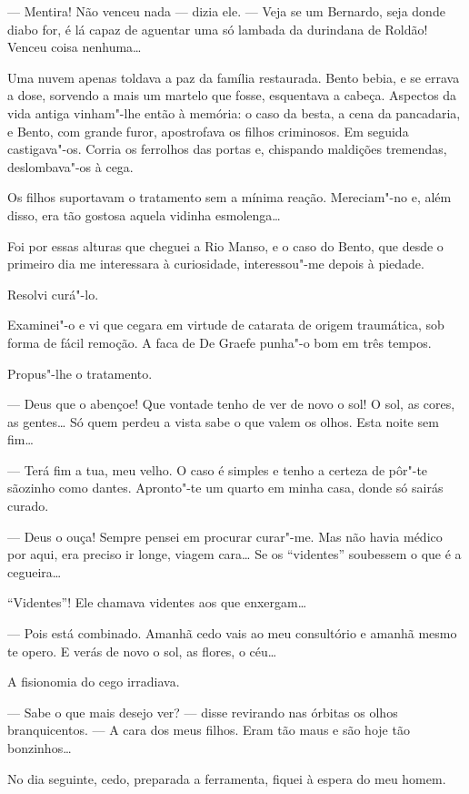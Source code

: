 --- Mentira! Não venceu nada --- dizia ele. --- Veja se um Bernardo,
seja donde diabo for, é lá capaz de aguentar uma só lambada da durindana
de Roldão! Venceu coisa nenhuma\ldots{}

Uma nuvem apenas toldava a paz da família restaurada. Bento bebia, e se
errava a dose, sorvendo a mais um martelo que fosse, esquentava a
cabeça. Aspectos da vida antiga vinham"-lhe então à memória: o caso da
besta, a cena da pancadaria, e Bento, com grande furor, apostrofava os
filhos criminosos. Em seguida castigava"-os. Corria os ferrolhos das
portas e, chispando maldições tremendas, deslombava"-os à cega.

Os filhos suportavam o tratamento sem a mínima reação. Mereciam"-no e,
além disso, era tão gostosa aquela vidinha esmolenga\ldots{}

Foi por essas alturas que cheguei a Rio Manso, e o caso do Bento, que
desde o primeiro dia me interessara à curiosidade, interessou"-me depois
à piedade.

Resolvi curá"-lo.

Examinei"-o e vi que cegara em virtude de catarata de origem traumática,
sob forma de fácil remoção. A faca de De Graefe punha"-o bom em três
tempos.

Propus"-lhe o tratamento.

--- Deus que o abençoe! Que vontade tenho de ver de novo o sol! O sol,
as cores, as gentes\ldots{} Só quem perdeu a vista sabe o que valem os olhos.
Esta noite sem fim\ldots{}

--- Terá fim a tua, meu velho. O caso é simples e tenho a certeza de
pôr"-te sãozinho como dantes. Apronto"-te um quarto em minha casa, donde
só sairás curado.

--- Deus o ouça! Sempre pensei em procurar curar"-me. Mas não havia
médico por aqui, era preciso ir longe, viagem cara\ldots{} Se os ``videntes''
soubessem o que é a cegueira\ldots{}

``Videntes''! Ele chamava videntes aos que enxergam\ldots{}

--- Pois está combinado. Amanhã cedo vais ao meu consultório e amanhã
mesmo te opero. E verás de novo o sol, as flores, o céu\ldots{}

A fisionomia do cego irradiava.

--- Sabe o que mais desejo ver? --- disse revirando nas órbitas os olhos
branquicentos. --- A cara dos meus filhos. Eram tão maus e são hoje tão
bonzinhos\ldots{}

No dia seguinte, cedo, preparada a ferramenta, fiquei à espera do meu
homem.

